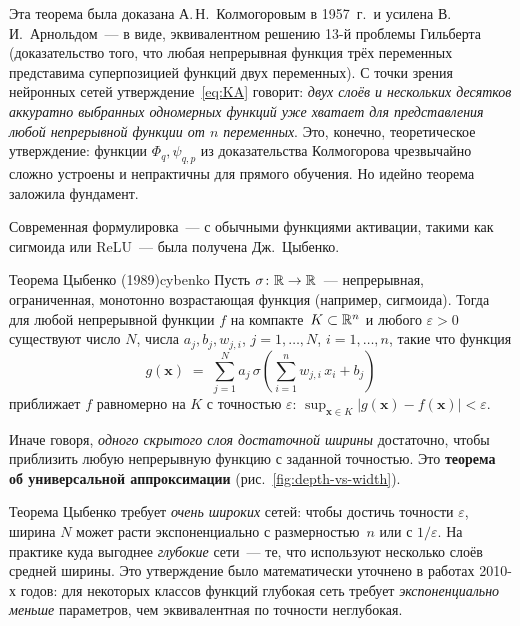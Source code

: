 Эта теорема была доказана А.\,Н.~Колмогоровым в 1957~г.\ и усилена
В.\,И.~Арнольдом~--- в виде, эквивалентном решению 13-й проблемы
Гильберта (доказательство того, что любая непрерывная функция трёх
переменных представима суперпозицией функций двух переменных). С
точки зрения нейронных сетей утверждение~\eqref{eq:KA} говорит:
\emph{двух слоёв и нескольких десятков аккуратно выбранных одномерных
функций уже хватает для представления любой непрерывной функции от
$n$ переменных}. Это, конечно, теоретическое утверждение: функции
$\Phi_q,\psi_{q,p}$ из доказательства Колмогорова чрезвычайно сложно
устроены и непрактичны для прямого обучения. Но идейно теорема
заложила фундамент.

Современная формулировка~--- с обычными функциями активации, такими
как сигмоида или ReLU~--- была получена Дж.~Цыбенко.

\begin{theorem}{Теорема Цыбенко (1989)}{cybenko}
Пусть $\sigma\colon\mathbb{R}\to\mathbb{R}$~--- непрерывная, ограниченная,
монотонно возрастающая функция (например, сигмоида). Тогда для любой
непрерывной функции $f$ на компакте~$K\subset\mathbb{R}^{n}$ и любого
$\varepsilon>0$ существуют число $N$, числа $a_j,b_j,w_{j,i}$,
$j=1,\dots,N$, $i=1,\dots,n$, такие что функция
\begin{equation}\label{eq:cybenko}
g(\mathbf x)\;=\;\sum_{j=1}^{N} a_j\,\sigma\!\left(\sum_{i=1}^{n}w_{j,i}\,x_i+b_j\right)
\end{equation}
приближает $f$ равномерно на $K$ с точностью $\varepsilon$:
$\sup_{\mathbf x\in K}|g(\mathbf x)-f(\mathbf x)|<\varepsilon$.
\end{theorem}

Иначе говоря, \emph{одного скрытого слоя достаточной ширины} достаточно,
чтобы приблизить любую непрерывную функцию с заданной точностью. Это
\textbf{теорема об универсальной аппроксимации} (рис.~\ref{fig:depth-vs-width}).

\begin{notebox}[title={Глубина vs ширина}]
Теорема Цыбенко требует \emph{очень широких} сетей: чтобы достичь
точности $\varepsilon$, ширина $N$ может расти экспоненциально с
размерностью~$n$ или с $1/\varepsilon$. На практике куда выгоднее
\emph{глубокие} сети~--- те, что используют несколько слоёв средней
ширины. Это утверждение было математически уточнено в работах
2010-х годов: для некоторых классов функций глубокая сеть требует
\emph{экспоненциально меньше} параметров, чем эквивалентная по
точности неглубокая.
\end{notebox}

